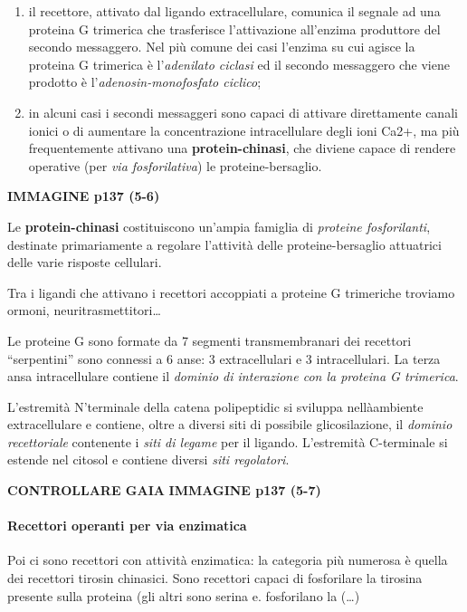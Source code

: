 \documentclass[]{article}
\begin{document}
\begin{enumerate}
\def\labelenumi{\arabic{enumi}.}
\itemsep1pt\parskip0pt
\item
  il recettore, attivato dal ligando extracellulare, comunica il segnale
  ad una proteina G trimerica che trasferisce l'attivazione all'enzima
  produttore del secondo messaggero. Nel più comune dei casi l'enzima su
  cui agisce la proteina G trimerica è l'\emph{adenilato ciclasi} ed il
  secondo messaggero che viene prodotto è l'\emph{adenosin-monofosfato
  ciclico};
\item
  in alcuni casi i secondi messaggeri sono capaci di attivare
  direttamente canali ionici o di aumentare la concentrazione
  intracellulare degli ioni Ca2+, ma più frequentemente attivano una
  \textbf{protein-chinasi}, che diviene capace di rendere operative (per
  \emph{via fosforilativa}) le proteine-bersaglio.
\end{enumerate}

\textbf{IMMAGINE p137 (5-6)}

Le \textbf{protein-chinasi} costituiscono un'ampia famiglia di
\emph{proteine fosforilanti}, destinate primariamente a regolare
l'attività delle proteine-bersaglio attuatrici delle varie risposte
cellulari.

Tra i ligandi che attivano i recettori accoppiati a proteine G
trimeriche troviamo ormoni, neuritrasmettitori\ldots{}

Le proteine G sono formate da 7 segmenti transmembranari dei recettori
``serpentini'' sono connessi a 6 anse: 3 extracellulari e 3
intracellulari. La terza ansa intracellulare contiene il \emph{dominio
di interazione con la proteina G trimerica}.

L'estremità N'terminale della catena polipeptidic si sviluppa
nellàambiente extracellulare e contiene, oltre a diversi siti di
possibile glicosilazione, il \emph{dominio recettoriale} contenente i
\emph{siti di legame} per il ligando. L'estremità C-terminale si estende
nel citosol e contiene diversi \emph{siti regolatori}.

\textbf{CONTROLLARE GAIA} \textbf{IMMAGINE p137 (5-7)}

\paragraph{Recettori operanti per via
enzimatica}\label{recettori-operanti-per-via-enzimatica}

Poi ci sono recettori con attività enzimatica: la categoria più numerosa
è quella dei recettori tirosin chinasici. Sono recettori capaci di
fosforilare la tirosina presente sulla proteina (gli altri sono serina
e. fosforilano la (\ldots{})
\end{document}
